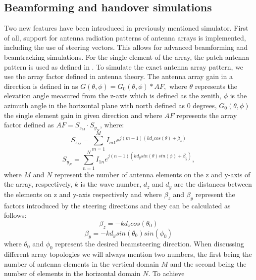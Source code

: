 \documentclass[conference,twocolumn]{IEEEtran}
\begin{document}
\subsection{Beamforming and handover simulations}
Two new features have been introduced in previously mentioned simulator. First of all, support for antenna radiation patterns of antenna arrays is implemented, including the use of steering vectors. This allows for advanced beamforming and beamtracking simulations. For the single element of the array, the patch antenna pattern is used as defined in \cite{3gpp.38.901}. To simulate the exact antenna array pattern, we use the array factor defined in antenna theory. The antenna array gain in a direction is defined in \cite{Balanis2016} as $G(\theta,\phi) = G_0(\theta,\phi) * AF,$ where $\theta$ represents the elevation angle measured from the z-axis which is defined as the zenith, $\phi$ is the azimuth angle in the horizontal plane with north defined as 0 degrees, $G_0(\theta,\phi)$ the single element gain in given direction and where $AF$ represents the array factor defined as $AF = S_{z_M} \cdot S_{y_N}$,
where:
\begin{equation}
    S_{z_M} = \sum_{m = 1}^{M}I_{m1}e^{j(m-1)(kd_zcos(\theta)+\beta_z)}
\end{equation}
\begin{equation}
    S_{y_N} = \sum_{n = 1}^{N}I_{1n}e^{j(n-1)(kd_ysin(\theta)sin(\phi)+\beta_y)},
\end{equation}
where $M$ and $N$ represent the number of antenna elements on the z and y-axis of the array, respectively, $k$ is the wave number, $d_z$ and $d_y$ are the distances between the elements on z and y-axis respectively and where $\beta_z$ and $\beta_y$ represent the factors introduced by the steering directions and they can be calculated as follows:
\begin{equation}
\beta_z = -kd_zcos(\theta_0)
\end{equation}
\begin{equation}
\beta_y = -kd_ysin(\theta_0)sin(\phi_0)
\end{equation}
where $\theta_0$ and $\phi_0$ represent the desired beamsteering direction. When discussing different array topologies we will always mention two numbers, the first being the number of antenna elements in the vertical domain $M$ and the second being the number of elements in the horizontal domain $N$. To achieve %
\end{document}
